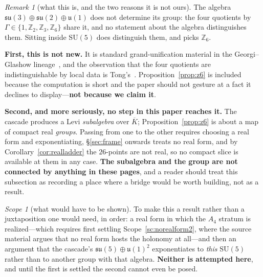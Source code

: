 \documentclass[11pt,reqno]{amsart}
\theoremstyle{plain}
\theoremstyle{definition}
\theoremstyle{remark}
\newtheorem{scope}[theorem]{Scope}
\newtheorem{remark}[theorem]{Remark}
\newcommand{\Z}{\mathbb{Z}}
\newcommand{\SU}{\mathrm{SU}}
\newcommand{\su}{\mathfrak{su}}
\newcommand{\uu}{\mathfrak{u}}
\begin{document}
\begin{remark}[what this is, and the two reasons it is not ours]\label{rem:globalform}
The algebra $\su(3)\oplus\su(2)\oplus\uu(1)$ does not determine its group: the four
quotients by $\Gamma\in\{1,\Z_2,\Z_3,\Z_6\}$ share it, and no statement about the algebra
distinguishes them. Sitting inside $\SU(5)$ does distinguish them, and picks $\Z_6$.

\textbf{First, this is not new.} It is standard grand-unification material in the
Georgi--Glashow lineage~\cite{GeorgiGlashow,Hucks,BaezHuerta}, and the observation that
the four quotients are indistinguishable by local data is Tong's~\cite{Tong}.
Proposition~\ref{prop:z6} is included because the computation is short and the paper
should not gesture at a fact it declines to display---\textbf{not because we claim it}.

\textbf{Second, and more seriously, no step in this paper reaches it.} The cascade
produces a Levi \emph{subalgebra} over $\overline K$; Proposition~\ref{prop:z6} is about
a map of compact real \emph{groups}. Passing from one to the other requires choosing a
real form and exponentiating, \S\ref{sec:frame} onwards treats no real form, and by
Corollary~\ref{cor:realladder} the $26$-points are not real, so no compact slice is
available at them in any case. \textbf{The subalgebra and the group are not connected by
anything in these pages}, and a reader should treat this subsection as recording a place
where a bridge would be worth building, not as a result.

\begin{scope}[what would have to be shown]\label{sc:bridge}
To make this a result rather than a juxtaposition one would need, in order: a real form
in which the $A_4$ stratum is realized---which requires first settling
Scope~\ref{sc:norealform2}, where the source material argues that no real form hosts the
holonomy at all---and then an argument that the cascade's $\su(5)\oplus\uu(1)^2$
exponentiates to \emph{this} $\SU(5)$ rather than to another group with that algebra.
\textbf{Neither is attempted here}, and until the first is settled the second cannot even
be posed.
\end{scope}
\end{remark}
\end{document}
